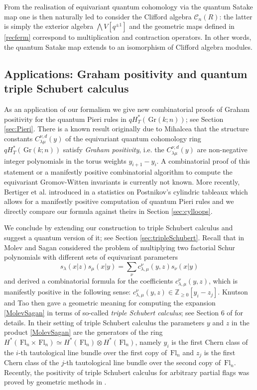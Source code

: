 \documentclass[12pt]{amsart}
\newcommand{\Z}{\mathbb{Z}}
\newcommand{\Fl}{\,\mathrm{Fl}}
\newcommand{\Gr}{\,\mathrm{Gr}}
\newcommand{\mc}[1]{\mathcal{#1}}
\newcommand{\ring}{R}
\numberwithin{equation}{section}
\numberwithin{figure}{section}
\begin{document}
From the realisation of equivariant quantum cohomology via the quantum Satake map one is then naturally led to consider the Clifford algebra $\mc{C}_n(\ring)$: the latter is simply the exterior algebra $\bigwedge V[q^{\pm 1}]$ and the geometric maps defined in \eqref{recferm} correspond to multiplication and contraction operators. In other words, the quantum Satake map extends to an isomorphism of Clifford algebra modules.

\subsection{Applications: Graham positivity and quantum triple Schubert calculus}
As an application of our formalism we give new combinatorial proofs of Graham positivity for the quantum Pieri rules in $qH^*_T(\Gr(k;n))$; see Section \ref{sec:Pieri}. There is a known result originally due to Mihalcea \cite{MihalceaAIM} that the structure constants $C^{\nu,d}_{\lambda\mu}(y)$ of the equivariant quantum cohomology ring $qH^*_T(\Gr(k;n))$ satisfy {\em Graham positivity}, i.e. the $C^{\nu,d}_{\lambda\mu}(y)$ are non-negative integer polynomials in the torus weights $y_{i+1}-y_i$. A combinatorial proof of this statement or a manifestly positive combinatorial algorithm to compute the equivariant Gromov-Witten invariants is currently not known. More recently, Bertiger et al. introduced in \cite{BEMT22} a statistics on Postnikov's \cite{Post05} cylindric tableaux which allows for a manifestly positive computation of quantum Pieri rules and we directly compare our formula against theirs in Section \ref{sec:cylloops}. 

We conclude by extending our construction to triple Schubert calculus and suggest a quantum version of it; see Section \ref{sec:tripleSchubert}. Recall that in \cite{MS99} Molev and Sagan considered the problem of multiplying two factorial Schur polynomials with different sets of equivariant parameters
\begin{equation}\label{MolevSagan}
    s_{\lambda}(x|z) s_{\mu}(x|y) = \sum\limits_{\nu} c_{\lambda, \mu}^{\nu}(y,z) s_{\nu}(x|y)
\end{equation}
and derived a combinatorial formula for the coefficients $c_{\lambda,\mu}^{\nu}(y,z)$, which is manifestly positive in the following sense: $c_{\lambda,\mu}^{\nu}(y,z) \in \Z_{\ge 0}[y_i - z_j]$. Knutson and Tao then gave a geometric meaning for computing the expansion \eqref{MolevSagan} in terms of so-called {\em triple Schubert calculus}; see Section 6 of \cite{KnutTao2003} for details. In their setting of triple Schubert calculus the parameters $y$ and $z$ in the product \eqref{MolevSagan} are the generators of the ring $H^*(\Fl_n \times \Fl_n) \simeq H^*(\Fl_n) \otimes H^*(\Fl_n)$, namely $y_i$ is the first Chern class of the $i$-th tautological line bundle over the first copy of $\Fl_n$ and $z_j$ is the first Chern class of the $j$-th tautological line bundle over the second copy of $\Fl_n$. Recently, the positivity of triple Schubert calculus for arbitrary partial flags was proved by geometric methods in \cite{gao2025graham}.
\end{document}
